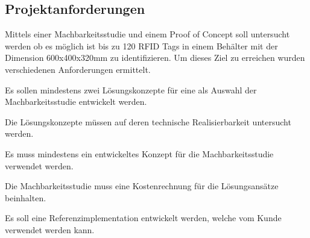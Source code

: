 \subsection{Projektanforderungen}
\label{sub:Anforderungen}
Mittels einer Machbarkeitsstudie und einem Proof of Concept soll untersucht werden ob es möglich ist bis zu 120 \gls{RFID} Tags in einem Behälter mit der Dimension 600x400x320mm zu identifizieren.
Um dieses Ziel zu erreichen wurden verschiedenen Anforderungen ermittelt.

\begin{legal}
	\item Es sollen mindestens zwei Lösungskonzepte für eine als Auswahl der Machbarkeitsstudie entwickelt werden.
	\item Die Lösungskonzepte müssen auf deren technische Realisierbarkeit untersucht werden.
	\item Es muss mindestens ein entwickeltes Konzept für die Machbarkeitsstudie verwendet werden.
	\item Die Machbarkeitsstudie muss eine Kostenrechnung für die Lösungsansätze beinhalten.
	\item Es soll eine Referenzimplementation entwickelt werden, welche vom Kunde verwendet werden kann.
	

\end{legal}
